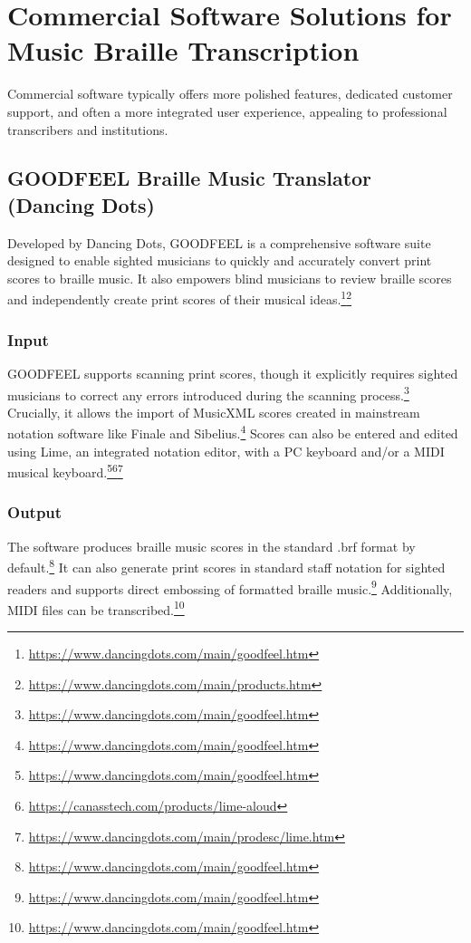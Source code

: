 \section{Commercial Software Solutions for Music Braille Transcription}

Commercial software typically offers more polished features, dedicated customer support, and often a more integrated user experience, appealing to professional transcribers and institutions.

\subsection{GOODFEEL Braille Music Translator (Dancing Dots)}
Developed by Dancing Dots, GOODFEEL is a comprehensive software suite designed to enable sighted musicians to quickly and accurately convert print scores to braille music. It also empowers blind musicians to review braille scores and independently create print scores of their musical ideas.\footnote{\url{https://www.dancingdots.com/main/goodfeel.htm}}\footnote{\url{https://www.dancingdots.com/main/products.htm}}

\subsubsection{Input}
GOODFEEL supports scanning print scores, though it explicitly requires sighted musicians to correct any errors introduced during the scanning process.\footnote{\url{https://www.dancingdots.com/main/goodfeel.htm}} Crucially, it allows the import of MusicXML scores created in mainstream notation software like Finale and Sibelius.\footnote{\url{https://www.dancingdots.com/main/goodfeel.htm}} Scores can also be entered and edited using Lime, an integrated notation editor, with a PC keyboard and/or a MIDI musical keyboard.\footnote{\url{https://www.dancingdots.com/main/goodfeel.htm}}\footnote{\url{https://canasstech.com/products/lime-aloud}}\footnote{\url{https://www.dancingdots.com/main/prodesc/lime.htm}}

\subsubsection{Output}
The software produces braille music scores in the standard .brf format by default.\footnote{\url{https://www.dancingdots.com/main/goodfeel.htm}} It can also generate print scores in standard staff notation for sighted readers and supports direct embossing of formatted braille music.\footnote{\url{https://www.dancingdots.com/main/goodfeel.htm}} Additionally, MIDI files can be transcribed.\footnote{\url{https://www.dancingdots.com/main/goodfeel.htm}}

